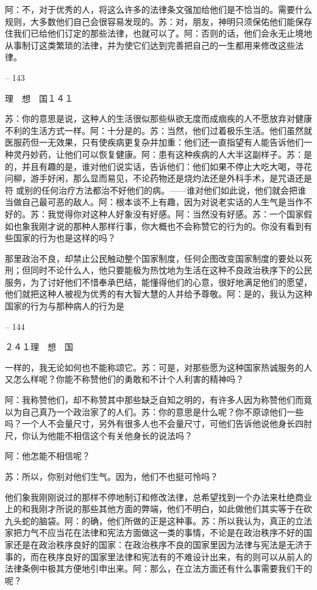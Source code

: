 \documentclass[11pt,oneside]{book}
\begin{document}
\begin{common-format}
    阿：不，对于优秀的人，将这么许多的法律条文强加给他们是不恰当的。需要什么规则，大多数他们自己会很容易发现的。苏：对，朋友，神明只须保佑他们能保存住我们已给他们订定的那些法律，也就可以了。阿：否则的话，他们会永无止境地从事制订这类繁琐的法律，并为使它们达到完善把自己的一生都用来修改这些法律。

    

-- 143

    理　想　国１４１

    苏：你的意思是说，这种人的生活很似那些纵欲无度而成痼疾的人不愿放弃对健康不利的生活方式一样。阿：十分是的。苏：当然，他们过着极乐生活。他们虽然就医服药但一无效果，只有使疾病更复杂并加重：他们还一直指望有人能告诉他们一种灵丹妙药，让他们可以恢复健康。阿：患有这种疾病的人大半这副样子。苏：是的，并且有趣的是，谁对他们说实话，告诉他们：他们如果不停止大吃大喝，寻花问柳，游手好闲，那么显而易见，不论药物还是烧灼法还是外科手术，是咒语还是符或别的任何治疗方法都治不好他们的病。——谁对他们如此说，他们就会把谁当做自己最可恶的敌人。阿：根本谈不上有趣，因为对说老实话的人生气是当作不好的。苏：我觉得你对这种人好象没有好感。阿：当然没有好感。苏：一个国家假如也象我刚才说的那种人那样行事，你大概也不会称赞它的行为的。你没有看到有些国家的行为也是这样的吗？

    那里政治不良，却禁止公民触动整个国家制度，任何企图改变国家制度的要处以死刑；但同时不论什么人，他只要能极为热忱地为生活在这种不良政治秩序下的公民服务，为了讨好他们不惜奉承巴结，能懂得他们的心意，很好地满足他们的愿望，他们就把这种人被视为优秀的有大智大慧的人并给予尊敬。阿：是的，我认为这种国家的行为与那种病人的行为是

    

-- 144

    ２４１理　想　国

    一样的，我无论如何也不能称颂它。苏：可是，对那些愿为这种国家热诚服务的人又怎么样呢？你能不称赞他们的勇敢和不计个人利害的精神吗？

    阿：我称赞他们，却不称赞其中那些缺乏自知之明的，有许多人因为称赞他们而竟以为自己真乃一个政治家了的人们。苏：你的意思是什么呢？你不原谅他们一些吗？一个人不会量尺寸，另外有很多人也不会量尺寸，可他们告诉他说他身长四肘尺，你认为他能不相信这个有关他身长的说法吗？

    阿：他怎能不相信呢？

    苏：所以，你别对他们生气。因为，他们不也挺可怜吗？

    他们象我刚刚说过的那样不停地制订和修改法律，总希望找到一个办法来杜绝商业上的和我刚才所说的那些其他方面的弊端，他们不明白，如此做他们其实等于在砍九头蛇的脑袋。阿：的确，他们所做的正是这种事。苏：所以我认为，真正的立法家把力气不应当花在法律和宪法方面做这一类的事情，不论是在政治秩序不好的国家还是在政治秩序良好的国家：在政治秩序不良的国家里因为法律与宪法是无济于事的，而在秩序良好的国家里法律和宪法有的不难设计出来，有的则可以从前人的法律条例中极其方便地引申出来。阿：那么，在立法方面还有什么事需要我们干的呢？


\end{common-format}
\end{document}
